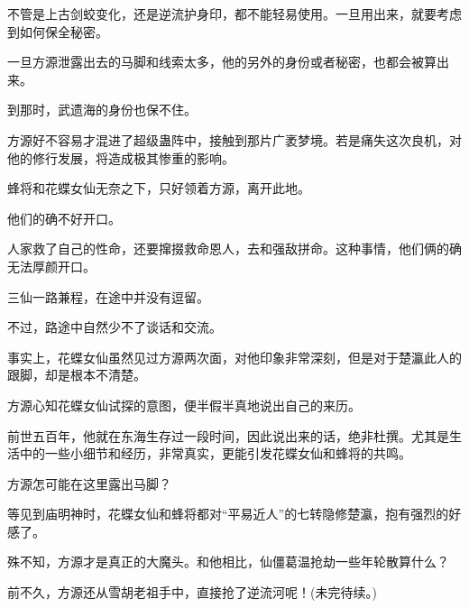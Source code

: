 \begin{this_body}
不管是上古剑蛟变化，还是逆流护身印，都不能轻易使用。一旦用出来，就要考虑到如何保全秘密。

一旦方源泄露出去的马脚和线索太多，他的另外的身份或者秘密，也都会被算出来。

到那时，武遗海的身份也保不住。

方源好不容易才混进了超级蛊阵中，接触到那片广袤梦境。若是痛失这次良机，对他的修行发展，将造成极其惨重的影响。

蜂将和花蝶女仙无奈之下，只好领着方源，离开此地。

他们的确不好开口。

人家救了自己的性命，还要撺掇救命恩人，去和强敌拼命。这种事情，他们俩的确无法厚颜开口。

三仙一路兼程，在途中并没有逗留。

不过，路途中自然少不了谈话和交流。

事实上，花蝶女仙虽然见过方源两次面，对他印象非常深刻，但是对于楚瀛此人的跟脚，却是根本不清楚。

方源心知花蝶女仙试探的意图，便半假半真地说出自己的来历。

前世五百年，他就在东海生存过一段时间，因此说出来的话，绝非杜撰。尤其是生活中的一些小细节和经历，非常真实，更能引发花蝶女仙和蜂将的共鸣。

方源怎可能在这里露出马脚？

等见到庙明神时，花蝶女仙和蜂将都对“平易近人”的七转隐修楚瀛，抱有强烈的好感了。

殊不知，方源才是真正的大魔头。和他相比，仙僵葛温抢劫一些年轮散算什么？

前不久，方源还从雪胡老祖手中，直接抢了逆流河呢！(未完待续。)

\end{this_body}

